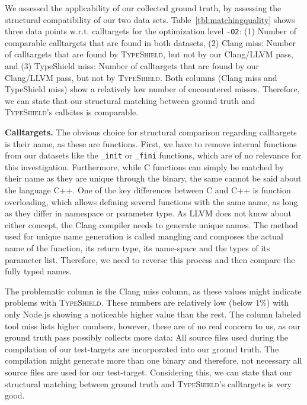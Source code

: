 We assessed the applicability of our collected ground truth, by assessing the structural compatibility of our two data sets. 
Table~\ref{tbl:matchingquality} shows three data points w.r.t. calltargets for the optimization level \texttt{-O2}:
(1) Number of comparable calltargets that are found in both datasets, 
(2) Clang miss: Number of calltargets that are found by \textsc{TypeShield}, but not by our Clang/LLVM pass, and 
(3) TypeShield miss: Number of calltargets that are found by our Clang/LLVM pass, but not by \textsc{TypeShield}.
Both columns (Clang miss and TypeShield miss) show a relatively low number of encountered misses. Therefore, we can 
state that our structural matching between ground truth and \textsc{TypeShield}'s callsites is comparable.

\textbf{Calltargets.} The obvious choice for structural comparison regarding calltargets is their name, as these are functions. First, we have to remove internal 
functions from our datasets like the \texttt{\_init} or \texttt{\_fini} functions, which are of no relevance for this investigation. Furthermore, while C functions can
simply be matched by their name as they are unique through the binary, the same cannot be said about the language C++. One of the key differences between C and C++ is 
function overloading, which allows defining several functions with the same name, as long as they differ in namespace or parameter type. 
As LLVM does not know about either concept, the Clang compiler needs to generate unique names. The method used for unique name generation is called mangling and composes
the actual name of the function, its return type, its name-space and the types of its parameter list. Therefore, we need to reverse this process and then compare the fully
typed names. 

The problematic column is the Clang miss column, as these values might indicate problems with \textsc{TypeShield}. These numbers are relatively low (below 1\%) with only Node.js
showing a noticeable higher value than the rest. The column labeled tool miss lists higher numbers, however, these are of no real concern to us, as our ground truth 
pass possibly collects more data: All source files used during the compilation of our test-targets are incorporated into our ground truth. The compilation might generate more than
one binary and therefore, not necessary all source files are used for our test-target.
Considering this, we can state that our structural matching between ground truth and \textsc{TypeShield}'s calltargets is very good.

